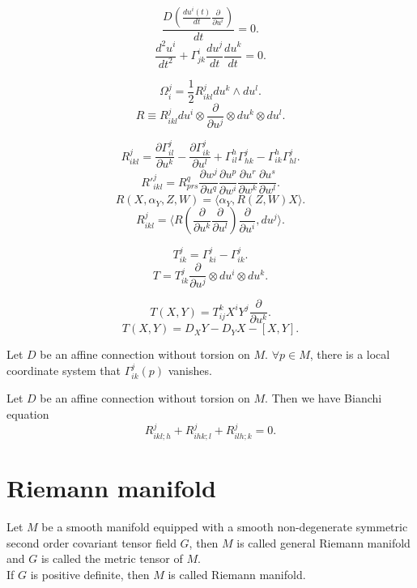 \begin{newdef}
\[\frac{D(\frac{du^i(t)}{dt} \frac{\partial}{\partial u^i})}{dt} = 0 .\]
\[\frac{d^2 u^i}{dt^2} + \Gamma^i_{jk} \frac{du^j}{dt} \frac{du^k}{dt} = 0.\]
\end{newdef}

\begin{newdef}
\[\Omega^j_i = \frac{1}{2}R^j_{ikl} du^k \wedge du^l .\]
\[R \equiv R^{j}_{ikl} du^{i} \otimes \frac{\partial}{\partial u^j} \otimes du^{k} \otimes du^{l}.\]
\end{newdef}

\begin{newprop}
\[R^j_{ikl} = \frac{\partial \Gamma^j_{il}}{\partial u^k} - \frac{\partial \Gamma^j_{ik}}{\partial u^l} + \Gamma^h_{il} \Gamma^j_{hk} - \Gamma^h_{ik} \Gamma^j_{hl}.\]
\[R'^j_{ikl} = R^q_{prs} \frac{\partial w^j}{\partial u^q} \frac{\partial u^p}{\partial w^i} \frac{\partial u^r}{\partial w^k}\frac{\partial u^s}{\partial w^l}.\]
\[R(X,\alpha_Y,Z,W)= \langle \alpha_Y,R(Z,W)X \rangle.\]
\[R^{j}_{ikl} = \langle R(\frac{\partial}{\partial u^k} \frac{\partial}{\partial u^l})\frac{\partial}{\partial u^i},du^j \rangle.\]
\end{newprop}


\begin{newdef}
\[T^j_{ik} = \Gamma^j_{ki} - \Gamma^j_{ik}.\]
\[T = T^j_{ik} \frac{\partial}{\partial u^j} \otimes du^i \otimes du^k.\]
\end{newdef}

\begin{newprop}
\[T(X,Y) = T^k_{ij}X^i Y^j \frac{\partial}{\partial u^k}.\]
\[T(X,Y) = D_X Y - D_Y X - [X,Y].\]
\end{newprop}

\begin{newthem}
Let $D$ be an affine connection without torsion on $M$. $\forall p \in M$, there is a local coordinate system that $\Gamma^j_{ik}(p)$ vanishes.
\end{newthem}

\begin{newthem}
Let $D$ be an affine connection without torsion on $M$. Then we have Bianchi equation
\[R^j_{ikl;h} + R^j_{ihk;l} + R^j_{ilh;k} = 0.\]
\end{newthem}

\section{Riemann manifold}
\begin{newdef} 
Let $M$ be a smooth manifold equipped with a smooth non-degenerate symmetric second order covariant tensor field $G$, then $M$ is called general Riemann manifold and $G$ is called the metric tensor of $M$.\\
If $G$ is positive definite, then $M$ is called Riemann manifold.
\end{newdef}

